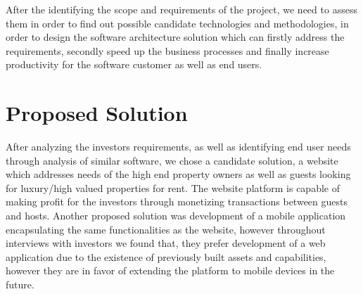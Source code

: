 After the identifying the scope and requirements of the project, we need to assess them in order to find out possible candidate technologies and methodologies, in order to design the software architecture solution which can firstly address the requirements, secondly speed up the business processes and finally increase productivity for the software customer as well as end users.  












\section{Proposed Solution}\label{sec:proposed_solution}
After analyzing the investors requirements, as well as identifying end user needs through analysis of similar software, we chose a candidate solution, a website which addresses needs of the high end property owners as well as guests looking for luxury/high valued properties for rent. The website platform is capable of making profit for the investors through monetizing transactions between guests and hosts.
Another proposed solution was development of a mobile application encapsulating the same functionalities as the website, however throughout interviews with investors we found that, they prefer development of a web application due to the existence of previously built assets and capabilities, however they are in favor of extending the platform to mobile devices in the future. 

 

